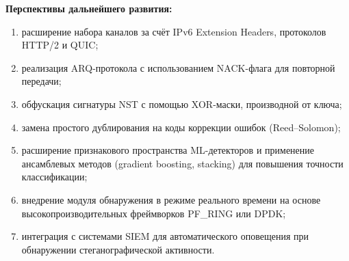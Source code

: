 \textbf{Перспективы дальнейшего развития:}
\begin{enumerate}[label=\arabic*)]
    \item расширение набора каналов за счёт IPv6 Extension Headers, протоколов HTTP/2 и QUIC;
    \item реализация ARQ-протокола с использованием NACK-флага для повторной передачи;
    \item обфускация сигнатуры NST с помощью XOR-маски, производной от ключа;
    \item замена простого дублирования на коды коррекции ошибок (Reed--Solomon);
    \item расширение признакового пространства ML-детекторов и применение ансамблевых методов (gradient boosting, stacking) для повышения точности классификации;
    \item внедрение модуля обнаружения в режиме реального времени на основе высокопроизводительных фреймворков PF\_RING или DPDK;
    \item интеграция с системами SIEM для автоматического оповещения при обнаружении стеганографической активности.
\end{enumerate}
